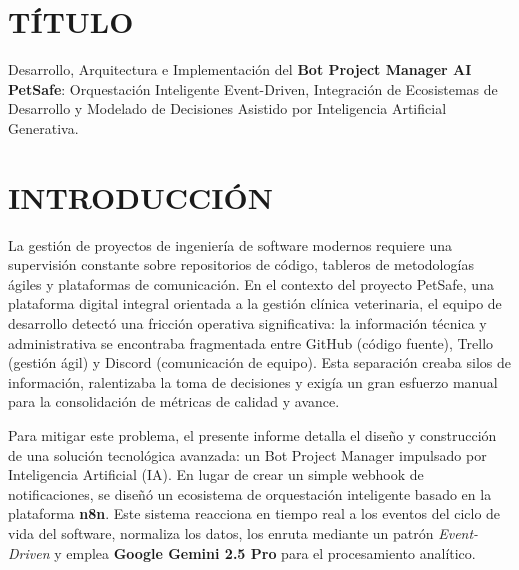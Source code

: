\documentclass{encabezado}
\begin{document}
\titleformat{\section}{\normalfont\Large\bfseries}{\thesection}{1em}{}
\titleformat{\subsection}{\normalfont\large\bfseries}{\thesubsection}{1em}{}
\titleformat{\subsubsection}{\normalfont\normalsize\bfseries}{\thesubsubsection}{1em}{}
\renewcommand{\thesection}{\Roman{section}}
\renewcommand{\thesubsection}{\arabic{section}.\arabic{subsection}}
\renewcommand{\thesubsubsection}{\arabic{section}.\arabic{subsection}.\arabic{subsubsection}}

\section{TÍTULO}

Desarrollo, Arquitectura e Implementación del \textbf{Bot Project Manager AI PetSafe}: Orquestación Inteligente Event-Driven, Integración de Ecosistemas de Desarrollo y Modelado de Decisiones Asistido por Inteligencia Artificial Generativa.

\section{INTRODUCCIÓN}

La gestión de proyectos de ingeniería de software modernos requiere una supervisión constante sobre repositorios de código, tableros de metodologías ágiles y plataformas de comunicación. En el contexto del proyecto PetSafe, una plataforma digital integral orientada a la gestión clínica veterinaria, el equipo de desarrollo detectó una fricción operativa significativa: la información técnica y administrativa se encontraba fragmentada entre GitHub (código fuente), Trello (gestión ágil) y Discord (comunicación de equipo). Esta separación creaba silos de información, ralentizaba la toma de decisiones y exigía un gran esfuerzo manual para la consolidación de métricas de calidad y avance.

Para mitigar este problema, el presente informe detalla el diseño y construcción de una solución tecnológica avanzada: un Bot Project Manager impulsado por Inteligencia Artificial (IA). En lugar de crear un simple webhook de notificaciones, se diseñó un ecosistema de orquestación inteligente basado en la plataforma \textbf{n8n}. Este sistema reacciona en tiempo real a los eventos del ciclo de vida del software, normaliza los datos, los enruta mediante un patrón \textit{Event-Driven} y emplea \textbf{Google Gemini 2.5 Pro} para el procesamiento analítico.
\end{document}
